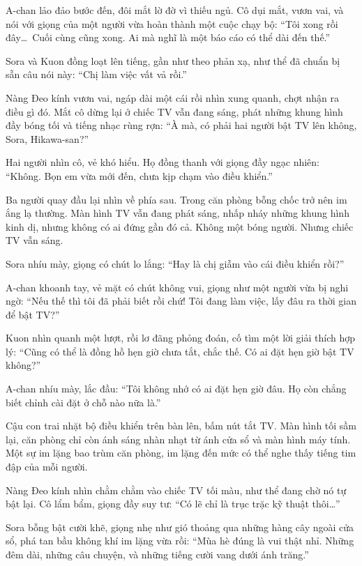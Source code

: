 \documentclass[../main.tex]{subfiles}
\begin{document}

A-chan lảo đảo bước đến, đôi mắt lờ đờ vì thiếu ngủ. Cô dụi mắt, vươn vai, và nói với giọng của một người vừa hoàn thành một cuộc chạy bộ: ``Tôi xong rồi đây\dots\ Cuối cùng cũng xong. Ai mà nghĩ là một báo cáo có thể dài đến thế.''

Sora và Kuon đồng loạt lên tiếng, gần như theo phản xạ, như thể đã chuẩn bị sẵn câu nói này: ``Chị làm việc vất vả rồi.''

Nàng Đeo kính vươn vai, ngáp dài một cái rồi nhìn xung quanh, chợt nhận ra điều gì đó. Mắt cô dừng lại ở chiếc TV vẫn đang sáng, phát những khung hình đầy bóng tối và tiếng nhạc rùng rợn: ``À mà, có phải hai người bật TV lên không, Sora, Hikawa-san?''

Hai người nhìn cô, vẻ khó hiểu. Họ đồng thanh với giọng đầy ngạc nhiên: ``Không. Bọn em vừa mới đến, chưa kịp chạm vào điều khiển.''

Ba người quay đầu lại nhìn về phía sau. Trong căn phòng bỗng chốc trở nên im ắng lạ thường. Màn hình TV vẫn đang phát sáng, nhấp nháy những khung hình kinh dị, nhưng không có ai đứng gần đó cả. Không một bóng người. Nhưng chiếc TV vẫn sáng.


Sora nhíu mày, giọng có chút lo lắng: ``Hay là chị giẫm vào cái điều khiển rồi?''

A-chan khoanh tay, vẻ mặt có chút không vui, giọng như một người vừa bị nghi ngờ: ``Nếu thế thì tôi đã phải biết rồi chứ! Tôi đang làm việc, lấy đâu ra thời gian để bật TV?''

Kuon nhìn quanh một lượt, rồi lơ đãng phỏng đoán, cố tìm một lời giải thích hợp lý: ``Cũng có thể là đồng hồ hẹn giờ chưa tắt, chắc thế. Có ai đặt hẹn giờ bật TV không?''

A-chan nhíu mày, lắc đầu: ``Tôi không nhớ có ai đặt hẹn giờ đâu. Họ còn chẳng biết chỉnh cài đặt ở chỗ nào nữa là.''

Cậu con trai nhặt bộ điều khiển trên bàn lên, bấm nút tắt TV. Màn hình tối sầm lại, căn phòng chỉ còn ánh sáng nhàn nhạt từ ánh cửa sổ và màn hình máy tính. Một sự im lặng bao trùm căn phòng, im lặng đến mức có thể nghe thấy tiếng tim đập của mỗi người.

Nàng Đeo kính nhìn chằm chằm vào chiếc TV tối màu, như thể đang chờ nó tự bật lại. Cô lẩm bẩm, giọng đầy suy tư: ``Có lẽ chỉ là trục trặc kỹ thuật thôi\dots''

\ct

Sora bỗng bật cười khẽ, giọng nhẹ như gió thoảng qua những hàng cây ngoài cửa sổ, phá tan bầu không khí im lặng vừa rồi: ``Mùa hè đúng là vui thật nhỉ. Những đêm dài, những câu chuyện, và những tiếng cười vang dưới ánh trăng.''
\end{document}
